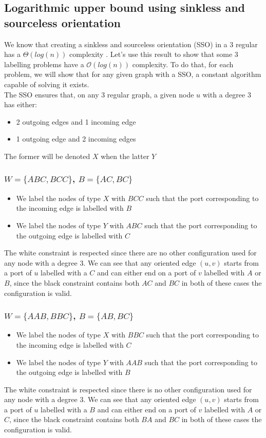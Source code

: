\subsection{Logarithmic upper bound using sinkless and sourceless orientation}
We know that creating a sinkless and sourceless orientation (SSO) in a 3 regular has a $\Theta(log(n))$ complexity \cite{1}. Let's use this result to show that some 3 labelling problems have a $\mathcal{O}(log(n))$ complexity. To do that, for each problem, we will show that for any given graph with a SSO, a constant algorithm capable of solving it exists.\\
The SSO ensures that, on any 3 regular graph, a given node $u$ with a degree 3 has either:
\begin{itemize}
    \item 2 outgoing edges and 1 incoming edge
    \item 1 outgoing edge and 2 incoming edges
\end{itemize}
The former will be denoted $X$ when the latter $Y$
\subsubsection[(W = (ABC, BCC), B = (AC,BC)]{$W = \{ABC, BCC\}$, $B = \{AC, BC\}$}
\begin{itemize}
    \item We label the nodes of type $X$ with $BCC$ such that the port corresponding to the incoming edge is labelled with $B$
    \item We label the nodes of type $Y$ with $ABC$ such that the port corresponding to the outgoing edge is labelled with $C$
\end{itemize}
The white constraint is respected since there are no other configuration used for any node with a degree 3.
We can see that any oriented edge $(u,v)$ starts from a port of $u$ labelled with a $C$ and can either end on a port of $v$ labelled with $A$ or $B$, since the black constraint contains both $AC$ and $BC$ in both of these cases the configuration is valid.
\subsubsection[(W = (AAB, BBC), B = (AB,BC)]{$W = \{AAB, BBC\}$, $B = \{AB, BC\}$}


\begin{itemize}
    \item We label the nodes of type $X$ with $BBC$ such that the port corresponding to the incoming edge is labelled with $C$
    \item We label the nodes of type $Y$ with $AAB$ such that the port corresponding to the outgoing edge is labelled with $B$
\end{itemize}
The white constraint is respected since there is no other configuration used for any node with a degree 3.
We can see that any oriented edge $(u,v)$ starts from a port of $u$ labelled with a $B$ and can either end on a port of $v$ labelled with $A$ or $C$, since the black constraint contains both $BA$ and $BC$ in both of these cases the configuration is valid.



